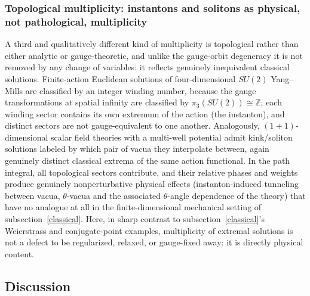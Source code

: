 \subsubsection{Topological multiplicity: instantons and solitons as physical,
not pathological, multiplicity}

A third and qualitatively different kind of multiplicity is topological rather
than either analytic or gauge-theoretic, and unlike the gauge-orbit degeneracy
it is not removed by any change of variables: it reflects genuinely
inequivalent classical solutions. Finite-action Euclidean solutions of
four-dimensional $SU(2)$ Yang--Mills are classified by an integer winding
number, because the gauge transformations at spatial infinity are classified by
$\pi_3(SU(2))\cong\mathbb{Z}$; each winding sector contains its own extremum of
the action (the instanton), and distinct sectors are not gauge-equivalent to
one another. Analogously, $(1{+}1)$-dimensional scalar field theories with a
multi-well potential admit kink/soliton solutions labeled by which pair of
vacua they interpolate between, again genuinely distinct classical extrema of
the same action functional. In the path integral, all topological sectors
contribute, and their relative phases and weights produce genuinely
nonperturbative physical effects (instanton-induced tunneling between vacua,
$\theta$-vacua and the associated $\theta$-angle dependence of the theory) that
have no analogue at all in the finite-dimensional mechanical setting of
subsection~\ref{classical}. Here, in sharp contrast to
subsection~\ref{classical}'s Weierstrass and conjugate-point examples,
multiplicity of extremal solutions is not a defect to be regularized, relaxed,
or gauge-fixed away: it is directly physical content.

\subsection{Discussion}
\label{discussion}

